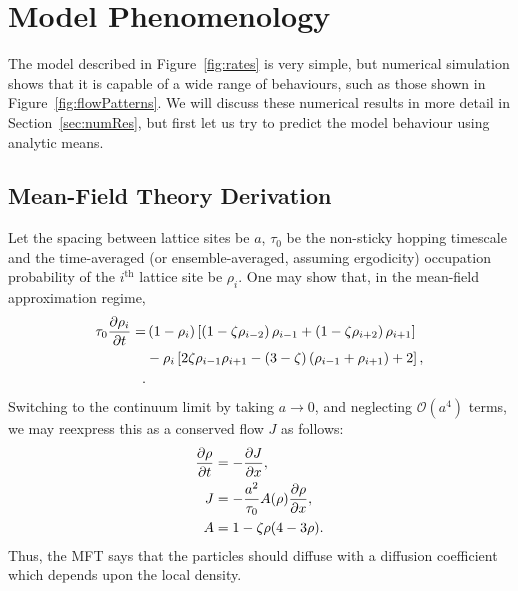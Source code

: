 \section{Model Phenomenology} \label{sec:pheno}
The model described in Figure~\ref{fig:rates} is very simple, but numerical simulation shows that it is capable of a wide range of behaviours, such as those shown in Figure~\ref{fig:flowPatterns}. We will discuss
these numerical results in more detail in Section~\ref{sec:numRes}, but first let us try to predict the model behaviour using analytic means.

\subsection{Mean-Field Theory Derivation}
Let the spacing between lattice sites be $a$, $\tau_0$ be the non-sticky hopping timescale and the time-averaged (or ensemble-averaged, assuming ergodicity) occupation probability of the $i^{\mathrm{th}}$ lattice site be $\rho_i$. 
One may show that, in the mean-field approximation regime,
\begin{align*}
 \tau_0 \frac{\partial \rho_i}{\partial t} = &\left( 1-\rho_i \right) \left[ \left(1-\zeta\rho_{i-2} \right) \rho_{i-1} + \left(1-\zeta\rho_{i+2} \right) \rho_{i+1} \right] \\
 &- \rho_i \left[ 2 \zeta \rho_{i-1} \rho_{i+1}  - (3-\zeta)\left(\rho_{i-1} + \rho_{i+1}\right) + 2 \right],\\.
\end{align*}
Switching to the continuum limit by taking $a\rightarrow 0$, and neglecting $\mathcal{O}(a^4)$ terms, we may reexpress this as a conserved flow $J$ as follows:
\begin{align*}
 \frac{\partial \rho}{\partial t} &= - \frac{\partial J}{\partial x}, \\
 J &= - \frac{a^2}{\tau_0} A(\rho) \frac{\partial \rho}{\partial x}, \\
 A &= 1 - \zeta \rho(4-3\rho). \\
\end{align*}
Thus, the MFT says that the particles should diffuse with a diffusion coefficient which depends upon the local density.
